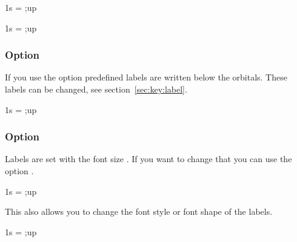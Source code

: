 \documentclass[load-preamble+]{cnltx-doc}
\begin{document}
\begin{example}
  \begin{MOdiagram}
     { 1s = {;up} }
  \end{MOdiagram}
  \begin{MOdiagram}[names-style-add={fill=blue!20}]
     { 1s = {;up} }
  \end{MOdiagram}
\end{example}

\subsubsection{Option }\label{option:labels}
If you use the option  predefined labels are written below the
orbitals.  These labels can be changed, see section~\ref{sec:key:label}.
\begin{example}
  \begin{MOdiagram}[labels]
     { 1s = {;up} }
  \end{MOdiagram}
\end{example}

\subsubsection{Option }\label{option:labels-fs}
Labels are set with the font size .  If you want to change that you
can use the option .
\begin{example}
  \begin{MOdiagram}[labels,labels-fs=\footnotesize]
     { 1s = {;up} }
  \end{MOdiagram}
\end{example}

This also allows you to change the font style or font shape of the labels.
\begin{example}
  \begin{MOdiagram}[labels,labels-fs=\sffamily\footnotesize]
     { 1s = {;up} }
  \end{MOdiagram}
\end{example}
\end{document}
